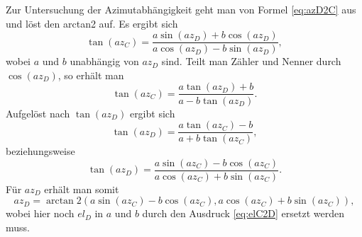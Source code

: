 Zur Untersuchung der Azimutabhängigkeit geht man von Formel \ref{eq:azD2C} aus und löst den arctan2 auf. Es ergibt sich
\begin{equation}
\tan\left(az_C\right)=\frac{a\sin\left(az_D\right)+b\cos\left(az_D\right)}{a\cos\left(az_D\right)-b\sin\left(az_D\right)},
\end{equation}
wobei $a$ und $b$ unabhängig von $az_D$ sind. Teilt man Zähler und Nenner durch $\cos\left(az_D\right)$, so erhält man
\begin{equation}
\tan\left(az_C\right)=\frac{a\tan\left(az_D\right)+b}{a-b\tan\left(az_D\right)}.
\end{equation}
Aufgelöst nach $\tan\left(az_D\right)$ ergibt sich
\begin{equation}
\tan\left(az_D\right)=\frac{a\tan\left(az_C\right)-b}{a+b\tan\left(az_C\right)},
\end{equation}
beziehungsweise
\begin{equation}
\tan\left(az_D\right)=\frac{a\sin\left(az_C\right)-b\cos\left(az_C\right)}{a\cos\left(az_C\right)+b\sin\left(az_C\right)}.
\end{equation}
Für $az_D$ erhält man somit 
\begin{equation}
az_D=\arctan 2\left(
a\sin\left(az_C\right)-b\cos\left(az_C\right),a\cos\left(az_C\right)+b\sin\left(az_C\right)\right),
\label{eq:azC2D}
\end{equation}
wobei hier noch $el_D$ in $a$ und $b$ durch den Ausdruck \ref{eq:elC2D} ersetzt werden muss.

